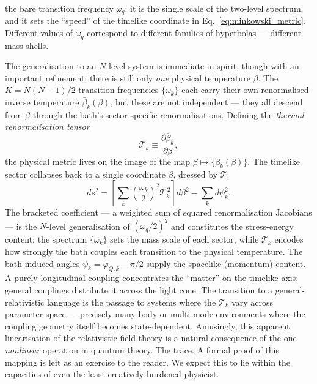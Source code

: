 the bare transition frequency \(\omega_q\): it is the single scale of the two-level spectrum, and
it sets the ``speed'' of the timelike coordinate in Eq.~\eqref{eq:minkowski_metric}. Different
values of \(\omega_q\) correspond to different families of hyperbolas — different mass shells.

The generalisation to an \(N\)-level system is immediate in spirit, though with an important
refinement: there is still only \emph{one} physical temperature \(\beta\). The \(K=N(N-1)/2\)
transition frequencies \(\{\omega_k\}\) each carry their own renormalised inverse temperature
\(\bar\beta_k(\beta)\), but these are not independent — they all descend from \(\beta\) through
the bath's sector-specific renormalisations. Defining the \emph{thermal renormalisation tensor}
\begin{equation}
    \mathcal{T}_k \equiv \frac{\partial\bar\beta_k}{\partial\beta},
    \label{eq:thermal_T_tensor}
\end{equation}
the physical metric lives on the image of the map \(\beta\mapsto\{\bar\beta_k(\beta)\}\). The
timelike sector collapses back to a single coordinate \(\beta\), dressed by \(\mathcal{T}\):
\begin{equation}
    ds^2 = \left[\sum_k \left(\frac{\omega_k}{2}\right)^{\!2} \mathcal{T}_k^{\,2}\right] d\beta^2
    - \sum_k d\psi_k^2.
    \label{eq:metric_N_level}
\end{equation}
The bracketed coefficient — a weighted sum of squared renormalisation Jacobians — is the
\(N\)-level generalisation of \((\omega_q/2)^2\) and constitutes the stress-energy content: the
spectrum \(\{\omega_k\}\) sets the mass scale of each sector, while \(\mathcal{T}_k\) encodes
how strongly the bath couples each transition to the physical temperature. The
bath-induced angles \(\psi_k = \varphi_{Q,k}-\pi/2\) supply the spacelike (momentum) content. A
purely longitudinal coupling concentrates the ``matter'' on the timelike axis; general couplings
distribute it across the light cone. The transition to a general-relativistic language is the
passage to systems where the \(\mathcal{T}_k\) vary across parameter space — precisely many-body
or multi-mode environments where the coupling geometry itself becomes state-dependent. Amusingly, this apparent linearisation of the relativistic field theory is a natural consequence of the one \emph{nonlinear} operation in quantum theory. The trace.  A formal proof of this mapping is left as an exercise to the reader. We expect this to lie within the capacities of even the least creatively burdened physicist. 



